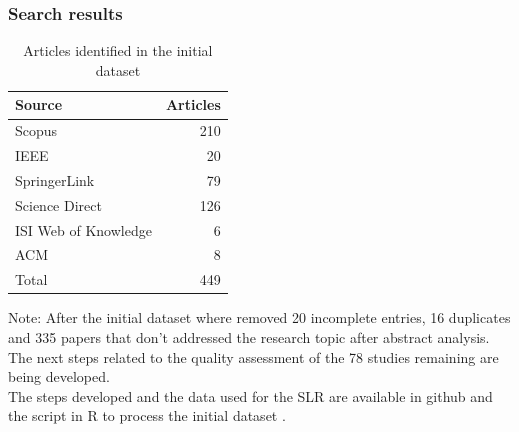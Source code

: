 \documentclass[10pt]{beamer}
\begin{document}
\begin{frame}
	\frametitle{Search results}
	\begin{center}
		\begin{table}
		  \centering
		  \scriptsize
		  \caption{Articles identified in the initial dataset}
		    \begin{tabular}{ | p{4cm} | r |}
			    \toprule
			    Source & Articles\\
			    \midrule
				Scopus & 210 \\ 
				IEEE &  20	\\ 
				SpringerLink & 79 \\ 
				Science Direct & 126 \\ 
				ISI Web of Knowledge & 6\\ 
				ACM & 8 \\ \hline
				Total & 449 \\
				\bottomrule
			\end{tabular}
			\label{Sources}
		\begin{flushleft}
			Note: After the initial dataset where removed 20 incomplete entries, 16 duplicates and 335 papers that don't addressed the research topic after abstract analysis. 
			The next steps related to the quality assessment of the 78 studies remaining are being developed. \\
			The steps developed and the data used for the SLR are available in github \href{https://github.com/pesobreiro/SLRDropout}{\color{red}{here}} and
			the script in R to process the initial dataset \href{https://github.com/pesobreiro/SLRDropout/blob/master/analysis/bibtexCleaning.Rmd}{\color{red}{here}}.
		\end{flushleft}
		\end{table}
	\end{center}
	
\end{frame}
\end{document}
